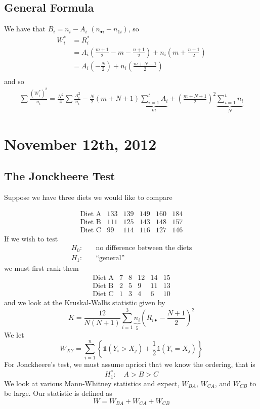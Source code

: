 \documentclass[a4paper,12pt]{amsart}
\newcommand{\sumin}{\sum_{i=1}^n}
\begin{document}
\subsection{General Formula}
We have that $B_i = n_i - A_i$ $(n_{\bullet i } - n_{1 i})$, so 
\begin{align*}
W_i^* &= R_i^*\\
&= A_i \left(\frac{m+1}{2} -m - \frac{n+1}{2}\right) + n_i\left(m + \frac{n+1}{2}\right)\\
&= A_i\left(- \frac{N}{2}\right) + n_i \left(\frac{m+N+1}{2}\right)\\
\end{align*}
and so
\begin{align*}
\sum \frac{(W_i^*)^2}{n_i} = \frac{N^2}{4}\sum \frac{A_i^2}{n_i} - \frac{N}{2}(m+N+1) \underbrace{\sum_{i=1}^t A_i}_m  + \left(\frac{m+N+1}{2}\right)^2\underbrace{\sum_{i=1}^t n_i}_N
\end{align*}



\section{November 12th, 2012}
\subsection{The Jonckheere Test}
Suppose we have three diets we would like to compare

\[\begin{array}{c|ccccc}
\text{Diet A} & 133 & 139 & 149 & 160 & 184\\
\hline
\text{Diet B} & 111 & 125 & 143 & 148 & 157\\
\hline
\text{Diet C} & 99 & 114 & 116 & 127 & 146
\end{array} \]
If we wish to test
\begin{align*}
H_0: & \quad\text{no difference between the diets}\\
H_1: & \quad\text{``general''}
\end{align*}
we must first rank them
\[\begin{array}{c|ccccc}
\text{Diet A} & 7 & 8 & 12 & 14 & 15\\
\hline
\text{Diet B} & 2 & 5 & 9 & 11 & 13\\
\hline
\text{Diet C} & 1 & 3 & 4 & 6 & 10
\end{array} \]
and we look at the Kruskal-Wallis statistic given by
\[K = \frac{12}{N(N+1)}\sum_{i=1}^3 \underbrace{n_i}_5 \left(\bar{R}_{i \bullet} - \frac{N+1}{2}\right)^2\]
We let
\[W_{XY} = \sumin \left\{\mathds{1}(Y_i > X_j) + \frac{1}{2}\mathds{1}(Y_i = X_j)\right\}\]
For Jonckheere's test, we must assume apriori that we know the ordering, that is
\[H_1^*: \quad A > B> C\]
We look at various Mann-Whitney statistics and expect,
$W_{BA}$, $W_{CA}$, and $W_{CB}$ to be large. Our statistic is defined as
\[W = W_{BA} + W_{CA} + W_{CB} \]
\end{document}
